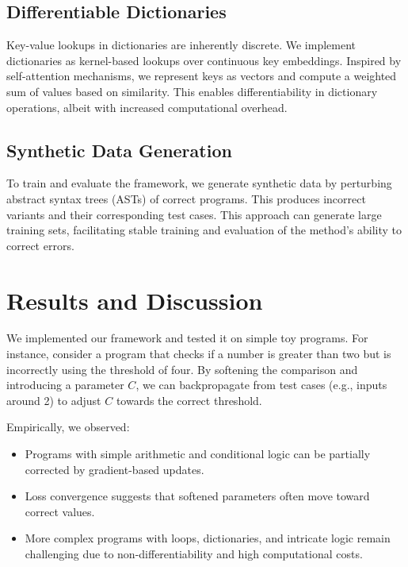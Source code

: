 \documentclass{article}
\begin{document}
\subsection{Differentiable Dictionaries}
Key-value lookups in dictionaries are inherently discrete. We implement dictionaries as kernel-based lookups over continuous key embeddings. Inspired by self-attention mechanisms, we represent keys as vectors and compute a weighted sum of values based on similarity. This enables differentiability in dictionary operations, albeit with increased computational overhead.

\subsection{Synthetic Data Generation}
To train and evaluate the framework, we generate synthetic data by perturbing abstract syntax trees (ASTs) of correct programs. This produces incorrect variants and their corresponding test cases. This approach can generate large training sets, facilitating stable training and evaluation of the method’s ability to correct errors.

\section{Results and Discussion}
We implemented our framework and tested it on simple toy programs. For instance, consider a program that checks if a number is greater than two but is incorrectly using the threshold of four. By softening the comparison and introducing a parameter $C$, we can backpropagate from test cases (e.g., inputs around 2) to adjust $C$ towards the correct threshold.

Empirically, we observed:
\begin{itemize}[leftmargin=*]
    \item Programs with simple arithmetic and conditional logic can be partially corrected by gradient-based updates.
    \item Loss convergence suggests that softened parameters often move toward correct values.
    \item More complex programs with loops, dictionaries, and intricate logic remain challenging due to non-differentiability and high computational costs.
\end{itemize}
\end{document}
